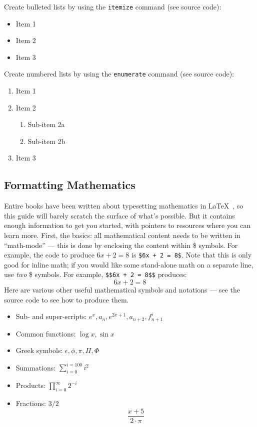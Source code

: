 Create bulleted lists by using the \texttt{itemize} command (see source code):
\begin{itemize}
  \item Item 1
  \item Item 2
  \item Item 3
\end{itemize}
Create numbered lists by using the \texttt{enumerate} command (see source code):
\begin{enumerate}
  \item Item 1
  \item Item 2
    \begin{enumerate}
    \item Sub-item 2a
    \item Sub-item 2b
    \end{enumerate}
  \item Item 3
\end{enumerate}

\subsection{Formatting Mathematics}
\label{subsec:math}

Entire books have been written about typesetting mathematics in
\LaTeX~, so this guide will barely scratch the surface of what's
possible. But it contains enough information to get you started, with
pointers to resources where you can learn more. First, the basics: all
mathematical content needs to be written in ``math-mode'' --- this is
done by enclosing the content within \$ symbols. For example, the code
to produce $6x + 2 = 8$ is \texttt{\$6x + 2 = 8\$}. Note that this is
only good for inline math; if you would like some stand-alone math on
a separate line, use \emph{two} \$ symbols. For example,
\texttt{\$\$6x + 2 = 8\$\$} produces: $$6x+2 = 8$$ Here are various
other useful mathematical symbols and notations --- see the source
code to see how to produce them.

\begin{itemize}
  \item Sub- and super-scripts: $e^{x}, a_{n}, e^{2x+1}, a_{n+2}, f^{i}_{n+1}$
  \item Common functions: $\log{x}, \sin{x}$
  \item Greek symbols: $\epsilon, \phi, \pi, \Pi, \Phi$ %
  \item Summations: $\sum_{i=0}^{i=100} i^{2}$ %
  \item Products: $\prod_{i=0}^{\infty} 2^{-i}$
  \item Fractions: $3/2$ %
    $$\frac{x + 5}{2 \cdot \pi}$$\\ %
\end{itemize}

